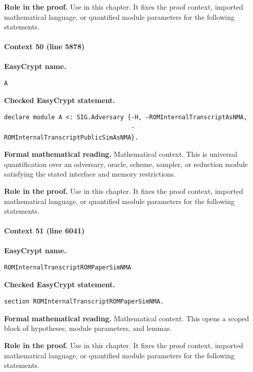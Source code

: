 \noindent\textbf{Role in the proof.}
Use in this chapter. It fixes the proof context, imported mathematical language, or quantified module parameters for the following statements.

\paragraph{Context 50 (line 5878)}
\noindent\textbf{EasyCrypt name.}
\begin{lstlisting}[language=EasyCrypt,basicstyle=\ttfamily\scriptsize]
A
\end{lstlisting}
\noindent\textbf{Checked EasyCrypt statement.}
\begin{lstlisting}[language=EasyCrypt,basicstyle=\ttfamily\scriptsize]
declare module A <: SIG.Adversary {-H, -ROMInternalTranscriptAsNMA,
                                   -ROMInternalTranscriptPublicSimAsNMA}.
\end{lstlisting}
\noindent\textbf{Formal mathematical reading.}
Mathematical context. This is universal quantification over an adversary, oracle, scheme, sampler, or reduction module satisfying the stated interface and memory restrictions.

\noindent\textbf{Role in the proof.}
Use in this chapter. It fixes the proof context, imported mathematical language, or quantified module parameters for the following statements.

\paragraph{Context 51 (line 6041)}
\noindent\textbf{EasyCrypt name.}
\begin{lstlisting}[language=EasyCrypt,basicstyle=\ttfamily\scriptsize]
ROMInternalTranscriptROMPaperSimNMA
\end{lstlisting}
\noindent\textbf{Checked EasyCrypt statement.}
\begin{lstlisting}[language=EasyCrypt,basicstyle=\ttfamily\scriptsize]
section ROMInternalTranscriptROMPaperSimNMA.
\end{lstlisting}
\noindent\textbf{Formal mathematical reading.}
Mathematical context. This opens a scoped block of hypotheses, module parameters, and lemmas.

\noindent\textbf{Role in the proof.}
Use in this chapter. It fixes the proof context, imported mathematical language, or quantified module parameters for the following statements.

